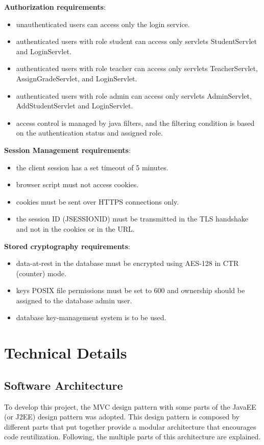 \noindent\textbf{Authorization requirements}:
\begin{itemize}
    \item unauthenticated users can access only the login service.
    \item authenticated users with role student can access only servlets StudentServlet and LoginServlet.
    \item authenticated users with role teacher can access only servlets TeacherServlet, AssignGradeServlet, and LoginServlet.
    \item authenticated users with role admin can access only servlets AdminServlet, AddStudentServlet and LoginServlet.
    \item access control is managed by java filters, and the filtering condition is based on the authentication status and assigned role.
\end{itemize}

\noindent\textbf{Session Management requirements}:
\begin{itemize}
    \item the client session has a set timeout of 5 minutes.
    \item browser script must not access cookies.
    \item cookies must be sent over HTTPS connections only.
    \item the session ID (JSESSIONID) must be transmitted in the TLS handshake and not in the cookies or in the URL.
\end{itemize}

\noindent\textbf{Stored cryptography requirements}:
\begin{itemize}
    \item data-at-rest in the database must be encrypted using AES-128 in CTR (counter) mode.
    \item keys POSIX file permissions must be set to 600 and ownership should be assigned to the database admin user.
    \item database key-management system is to be used.
\end{itemize}
\newpage
\chapter{Technical Details}

\section{Software Architecture}
To develop this project, the MVC design pattern with some parts of the JavaEE (or J2EE) design pattern was adopted. This design pattern is composed by different parts that put together provide a modular architecture that encourages code reutilization. Following, the multiple parts of this architecture are explained.

